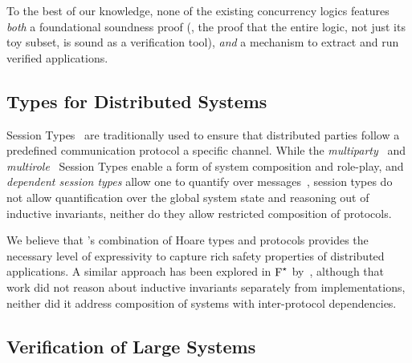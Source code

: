 To the best of our knowledge, none of the existing concurrency logics
features \emph{both} a foundational soundness proof (\ie, the proof that
the entire logic, not just its toy subset, is sound as a verification
tool), \emph{and} a mechanism to extract and run verified
applications.
%

\subsection{Types for Distributed Systems}
%
%
Session Types~\cite{Honda-al:ESOP98} are traditionally used to ensure
that distributed parties follow a predefined communication protocol
\wrt a specific channel. While the
\emph{multiparty}~\cite{Honda-al:POPL08} and
\emph{multirole}~\cite{Denielou-Yoshida:POPL11} Session Types enable a
form of system composition and role-play, and \emph{dependent session
  types} allow one to quantify over messages~\cite{Toninho-al:PPDP11},
session types do not allow quantification over the global system state
and reasoning out of inductive invariants, neither do they allow
restricted composition of protocols.

We believe that \disel's combination of Hoare types and protocols
provides the necessary level of expressivity to capture rich safety
properties of distributed applications.
%
A similar approach has been explored in $\text{F}^{\star}$
by~\citet{Swamy-al:ICFP11}, although that work did not reason about
inductive invariants separately from implementations, neither did it
address composition of systems with inter-protocol dependencies.

\subsection{Verification of Large Systems}


